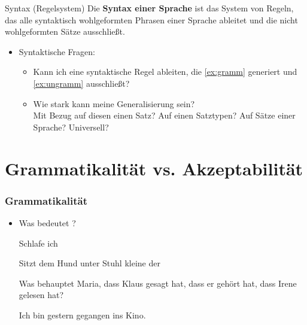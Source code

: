 \begin{frame}

\begin{block}{Syntax (Regelsystem)}
Die \textbf{Syntax einer Sprache} ist das System von Regeln, das alle syntaktisch wohlgeformten Phrasen einer Sprache ableitet und die nicht wohlgeformten Sätze ausschließt.
\end{block}

	\z
	
	\z
	
\begin{itemize}
	\item Syntaktische Fragen:\\
	\begin{itemize}
		\item Kann ich eine syntaktische Regel ableiten, die \ref{ex:gramm} generiert und \ref{ex:ungramm} ausschließt?
		\item Wie stark kann meine Generalisierung sein?\\
		\ras Mit Bezug auf diesen einen Satz? Auf einen Satztypen? Auf Sätze einer Sprache? Universell?
	\end{itemize}

\end{itemize}

\end{frame}


\section{Grammatikalität vs. Akzeptabilität}


\begin{frame}
\frametitle{Grammatikalität}

\begin{itemize}
	\item Was bedeutet ?
	
	\ea Schlafe ich
	\z
	
	\ea Sitzt dem Hund unter Stuhl kleine der
	\z
	
	\ea Was behauptet Maria, dass Klaus gesagt hat, dass er gehört hat, dass Irene gelesen hat?
	\z
	
	\ea Ich bin gestern gegangen ins Kino.
	\z
	
	\nocite{Finkbeiner&Meibauer14a}
\end{itemize}

\end{frame}

